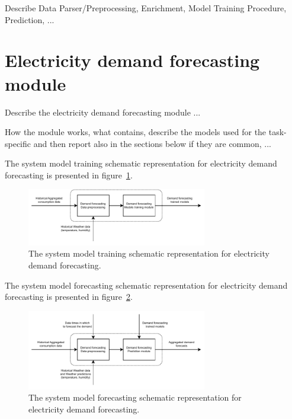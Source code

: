 Describe Data Parser/Preprocessing, Enrichment, Model Training Procedure, Prediction, ...


\section{Electricity demand forecasting module}
\label{sec:demandmodel}
\vspace{0.2 cm}

Describe the electricity demand forecasting module ...

How the module works, what contains, describe the models used for the task-specific and then report also in the sections below if they are common, ...

The system model training schematic representation for electricity demand forecasting is presented in figure~\ref{fig:modeltrainingdemand}.


\begin{figure}[H]
\centering
\includegraphics[width=0.7\textwidth]{images/system_model_training_demand}
\caption{The system model training schematic representation for electricity demand forecasting.}
\label{fig:modeltrainingdemand}
\end{figure}

The system model forecasting schematic representation for electricity demand forecasting is presented in figure~\ref{fig:modelforecastingdemand}.

\begin{figure}[H]
\centering
\includegraphics[width=0.7\textwidth]{images/system_model_forecasting_demand}
\caption{The system model forecasting schematic representation for electricity demand forecasting.}
\label{fig:modelforecastingdemand}
\end{figure}



